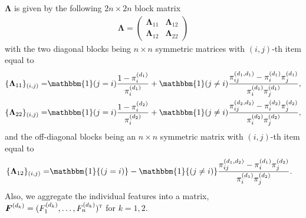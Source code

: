 \documentclass{article}
\theoremstyle{plain}
\theoremstyle{definition}
\theoremstyle{remark}
\def\T{{\textsc{t}}}
\newcommand{\bF}{\boldsymbol{F}}
\newcommand{\bLambda}{\boldsymbol{\Lambda}}
\newcommand{\indicator}{\mathbbm{1}}
\begin{document}
$\bLambda$ is given by the following $2n\times 2n$ block matrix
\begin{align}\label{eq::bLambda}
    \bLambda =
    \begin{pmatrix}
        \bLambda_{11} & \bLambda_{12} \\
        \bLambda_{12} & \bLambda_{22}
    \end{pmatrix}
\end{align}
with the two diagonal blocks being $n\times n$ symmetric matrices with $(i,j)$-th item equal to
{\small
\begin{align*}
    \{\bLambda_{11}\}_{(i,j)} =& \indicator(j=i) \frac{1-\pi_i^{(d_1)}}{\pi_i^{(d_1)}} 
    + \indicator(j\neq i)\frac{\pi_{ij}^{(d_1,d_1)}-\pi_i^{(d_1)}\pi_j^{(d_1)}}{\pi_i^{(d_1)}\pi_j^{(d_1)}}, \\
    \{\bLambda_{22}\}_{(i,j)} =& \indicator(j=i) \frac{1-\pi_i^{(d_2)}}{\pi_i^{(d_2)}} 
    + \indicator(j\neq i)\frac{\pi_{ij}^{(d_2,d_2)}-\pi_i^{(d_2)}\pi_j^{(d_2)}}{\pi_i^{(d_2)}\pi_j^{(d_2)}},
\end{align*}
}
and the off-diagonal blocks being an $n\times n$ symmetric matrix with $(i,j)$-th item equal to
{\small
\begin{align*}
    \{\bLambda_{12}\}_{(i,j)} =& \indicator{(j=i)} 
    - \indicator{(j\neq i)}\frac{\pi_{ij}^{(d_1,d_2)}-\pi_i^{(d_1)}\pi_j^{(d_2)}}{\pi_i^{(d_1)}\pi_j^{(d_2)}}.
\end{align*}
}
Also, we aggregate the individual features into a matrix, $\bF^{(d_k)} = (F_1^{(d_k)},\ldots,F_n^{(d_k)})^{\T}$ for $k = 1,2$. 
\end{document}
